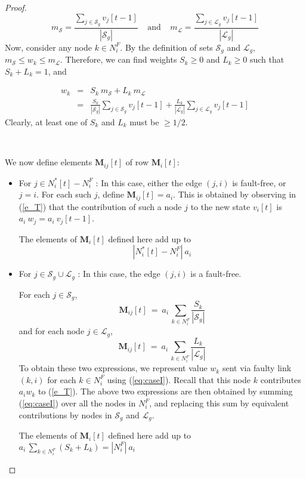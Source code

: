 \documentclass{llncs}
\newcommand{\scriptl}{\mathcal{L}}
\newcommand{\scripts}{\mathcal{S}}
\newcommand{\matrixm}{\textbf{M}}
\begin{document}
\begin{proof}
\begin{equation*}
m_{\scripts} = \frac{\sum_{j \in \scripts_g} v_j[t-1]}{|\scripts_g|}~~~~~\text{and}~~~~~m_{\scriptl} = \frac{\sum_{j \in \scriptl_g} v_j[t-1]}{|\scriptl_g|}
\end{equation*}
Now, consider any node $k \in N_i^F$. By the definition of sets $\scripts_g$ and $\scriptl_g$,
$m_{\scripts} \leq w_k \leq m_{\scriptl}$. Therefore, we can find weights $S_k \geq 0$ and $L_k \geq 0$ such that $S_k + L_k = 1$, and

\begin{eqnarray}
w_k & = & S_k~m_{\scripts} + L_k~m_{\scriptl} \\
& = & 
\frac{S_k}{|\scripts_g|}
\sum_{j \in \scripts_g} v_j[t-1]
+
\frac{L_k}{|\scriptl_g|}
\sum_{j \in \scriptl_g} v_j[t-1]
\label{eq:caseI}
\end{eqnarray}
Clearly, at least one of $S_k$ and $L_k$ must be $\geq 1/2$.

~


We now define elements $\matrixm_{ij}[t]$ of row $\matrixm_i[t]$:

\begin{itemize}
\item For $j \in N_i^*[t] - N_i^F$ : In this case, either the edge $(j,i)$ is fault-free, or $j = i$.
For each such $j$, define $\matrixm_{ij}[t] = a_i$. This is obtained by observing
in (\ref{e_T}) that the contribution of such a node $j$ to the new state
$v_i[t]$ is $a_i~w_j = a_i~v_j[t-1]$.

The elements of $\matrixm_i[t]$ defined here add up to $$|N_i^*[t] - N_i^F|~a_i$$



\item For $j\in \scripts_g\cup\scriptl_g$ : In this case, the edge $(j,i)$ is a fault-free.

For each $j \in \scripts_g$,
\[
\matrixm_{ij}[t] ~=~ a_i \, \sum_{k \in N_i^F} \frac{S_k}{|\scripts_g|}
\]
and for each node $j \in \scriptl_g$,
\[
\matrixm_{ij}[t] ~=~ a_i \, \sum_{k \in N_i^F} \frac{L_k}{|\scriptl_g|}
\]
To obtain these two expressions, we represent value $w_k$ sent via faulty link $(k,i)$ for each $k \in N_i^F$ using (\ref{eq:caseI}).  
Recall that this node $k$ contributes $a_iw_k$ to (\ref{e_T}).
The above two expressions are then obtained by summing (\ref{eq:caseI})
over all the nodes in $N_i^F$, and replacing this sum
by equivalent contributions by nodes in $\scripts_g$ and $\scriptl_g$.

The elements of $\matrixm_i[t]$ defined here add up to $a_i \, \sum_{k \in N_i^F} (S_k + L_k) = |N_i^F|~a_i$




\end{itemize}
\end{proof}
\end{document}
